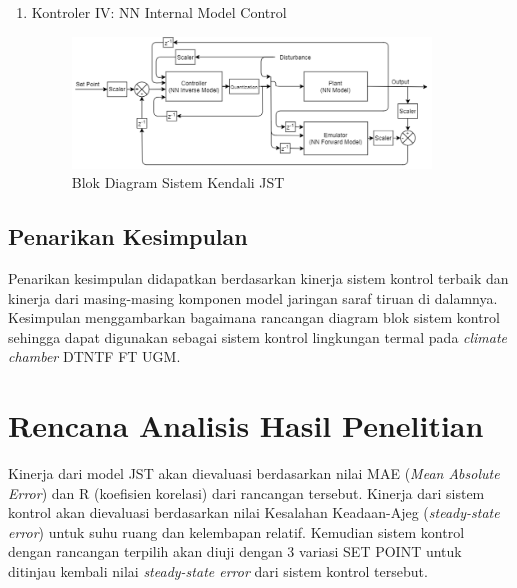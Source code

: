 \begin{enumerate}
	\item Kontroler IV: NN Internal Model Control
	\begin{figure}[!h]
		\centering
		\includegraphics[width=0.9\textwidth]{figures/ControlDesignDiagram}
		\caption{Blok Diagram Sistem Kendali JST}
		\label{fig:4:ConstrolSystemBlockDiagram}
	\end{figure}
\end{enumerate}



\subsection{{Penarikan Kesimpulan}}
Penarikan kesimpulan didapatkan berdasarkan kinerja sistem kontrol terbaik dan kinerja dari masing-masing komponen model jaringan saraf tiruan di dalamnya. Kesimpulan menggambarkan bagaimana rancangan diagram blok sistem kontrol sehingga dapat digunakan sebagai sistem kontrol lingkungan termal pada \textit{climate chamber} DTNTF FT UGM.

\section{Rencana Analisis Hasil Penelitian}
Kinerja dari model JST akan dievaluasi berdasarkan nilai MAE (\textit{Mean Absolute Error}) dan R (koefisien korelasi) dari rancangan tersebut. Kinerja dari sistem kontrol akan dievaluasi berdasarkan nilai Kesalahan Keadaan-Ajeg (\textit{steady-state error}) untuk suhu ruang dan kelembapan relatif. Kemudian sistem kontrol dengan rancangan terpilih akan diuji dengan 3 variasi SET POINT untuk ditinjau kembali nilai \textit{steady-state error} dari sistem kontrol tersebut.